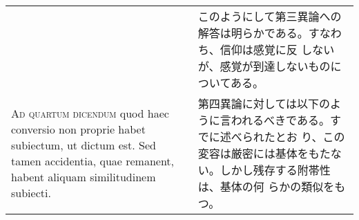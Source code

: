 \documentclass[10pt]{jsarticle} %
\begin{document}
\begin{longtable}{p{21em}p{21em}}
&

このようにして第三異論への解答は明らかである。すなわち、信仰は感覚に反
しないが、感覚が到達しないものについてある。

\\



{\scshape Ad quartum dicendum} quod haec conversio non proprie habet
subiectum, ut dictum est. Sed tamen accidentia, quae remanent, habent
aliquam similitudinem subiecti.

&

第四異論に対しては以下のように言われるべきである。すでに述べられたとお
り、この変容は厳密には基体をもたない。しかし残存する附帯性は、基体の何
らかの類似をもつ。


\end{longtable}
\newpage
\end{document}
